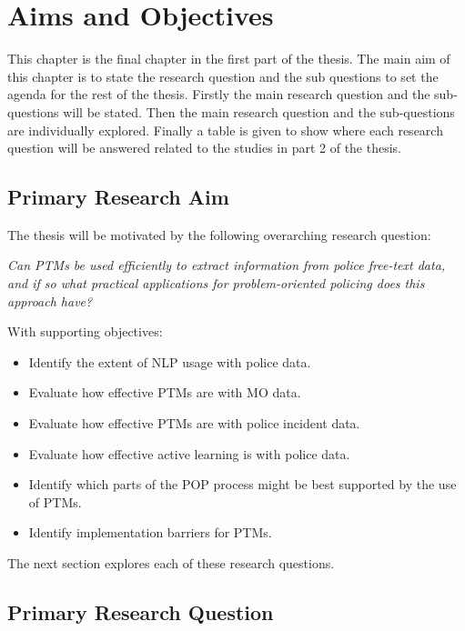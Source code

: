\chapter{Aims and Objectives} This chapter is the final chapter in the first part of the thesis. The main aim of this chapter is to state the research question and the sub questions to set the agenda for the rest of the thesis. Firstly the main research question and the sub-questions will be stated. Then the main research question and the sub-questions are individually explored. Finally a table is given to show where each research question will be answered related to the studies in part 2 of the thesis.

\section{Primary Research Aim}
The thesis will be motivated by the following overarching research question: 

\emph{Can PTMs be used efficiently to extract information from police free-text data, and if so what practical applications for problem-oriented policing does this approach have?}

With supporting objectives:
\begin{itemize}
\item Identify the extent of NLP usage with police data.

\item Evaluate how effective PTMs are with MO data.

\item Evaluate how effective PTMs are with police incident data.

\item Evaluate how effective active learning is with police data.

\item Identify which parts of the POP process might be best supported by the use of PTMs.

\item Identify implementation barriers for PTMs.

\end{itemize}

The next section explores each of these research questions.

\section{Primary Research Question}


